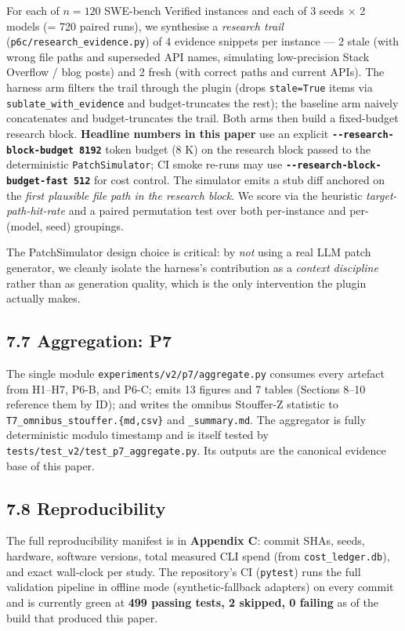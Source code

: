 For each of \(n=120\) SWE-bench Verified instances and each of 3 seeds × 2 models (= 720 paired runs), we synthesise a \emph{research trail} (\texttt{p6c/research\_evidence.py}) of 4 evidence snippets per instance --- 2 stale (with wrong file paths and superseded API names, simulating low-precision Stack Overflow / blog posts) and 2 fresh (with correct paths and current APIs). The harness arm filters the trail through the plugin (drops \texttt{stale=True} items via \texttt{sublate\_with\_evidence} and budget-truncates the rest); the baseline arm naively concatenates and budget-truncates the trail. Both arms then build a fixed-budget research block. \textbf{Headline numbers in this paper} use an explicit \textbf{\texttt{-\/-research-block-budget\ 8192}} token budget (8 K) on the research block passed to the deterministic \texttt{PatchSimulator}; CI smoke re-runs may use \textbf{\texttt{-\/-research-block-budget-fast\ 512}} for cost control. The simulator emits a stub diff anchored on the \emph{first plausible file path in the research block}. We score via the heuristic \emph{target-path-hit-rate} and a paired permutation test over both per-instance and per-(model, seed) groupings.

The PatchSimulator design choice is critical: by \emph{not} using a real LLM patch generator, we cleanly isolate the harness's contribution as a \emph{context discipline} rather than as generation quality, which is the only intervention the plugin actually makes.

\subsection{7.7 Aggregation: P7}\label{aggregation-p7}

The single module \texttt{experiments/v2/p7/aggregate.py} consumes every artefact from H1--H7, P6-B, and P6-C; emits 13 figures and 7 tables (Sections 8--10 reference them by ID); and writes the omnibus Stouffer-Z statistic to \texttt{T7\_omnibus\_stouffer.\{md,csv\}} and \texttt{\_summary.md}. The aggregator is fully deterministic modulo timestamp and is itself tested by \texttt{tests/test\_v2/test\_p7\_aggregate.py}. Its outputs are the canonical evidence base of this paper.

\subsection{7.8 Reproducibility}\label{reproducibility}

The full reproducibility manifest is in \textbf{Appendix C}: commit SHAs, seeds, hardware, software versions, total measured CLI spend (from \texttt{cost\_ledger.db}), and exact wall-clock per study. The repository's CI (\texttt{pytest}) runs the full validation pipeline in offline mode (synthetic-fallback adapters) on every commit and is currently green at \textbf{499 passing tests, 2 skipped, 0 failing} as of the build that produced this paper.
